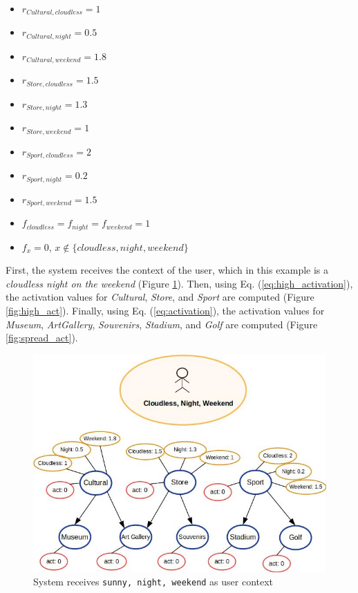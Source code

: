 \begin{itemize}
    \item $r_{Cultural, cloudless} = 1$
    \item $r_{Cultural, night} = 0.5$
    \item $r_{Cultural, weekend} = 1.8$
    \item $r_{Store, cloudless} = 1.5$
    \item $r_{Store, night} = 1.3$
    \item $r_{Store, weekend} = 1$
    \item $r_{Sport, cloudless} = 2$
    \item $r_{Sport, night} = 0.2$
    \item $r_{Sport, weekend} = 1.5$
    \item $f_{cloudless} = f_{night} = f_{weekend} = 1$
    \item $f_x = 0$, $x \notin \{cloudless, night, weekend\}$
\end{itemize}

First, the system receives the context of the user, which in this example is a {\it cloudless night on the weekend} (Figure \ref{fig:init_act}). Then, using Eq. (\ref{eq:high_activation}), the activation values for \textit{Cultural}, \textit{Store}, and \textit{Sport} are computed (Figure \ref{fig:high_act}). Finally, using Eq. (\ref{eq:activation}), the activation values for \textit{Museum}, \textit{ArtGallery}, \textit{Souvenirs}, \textit{Stadium}, and \textit{Golf} are computed (Figure \ref{fig:spread_act}).

\begin{figure}[h]
\centering
\includegraphics[scale=0.45]{draws/initial_act.jpg}
\caption{System receives {\tt sunny, night, weekend} as user context}
\label{fig:init_act}
\end{figure}


